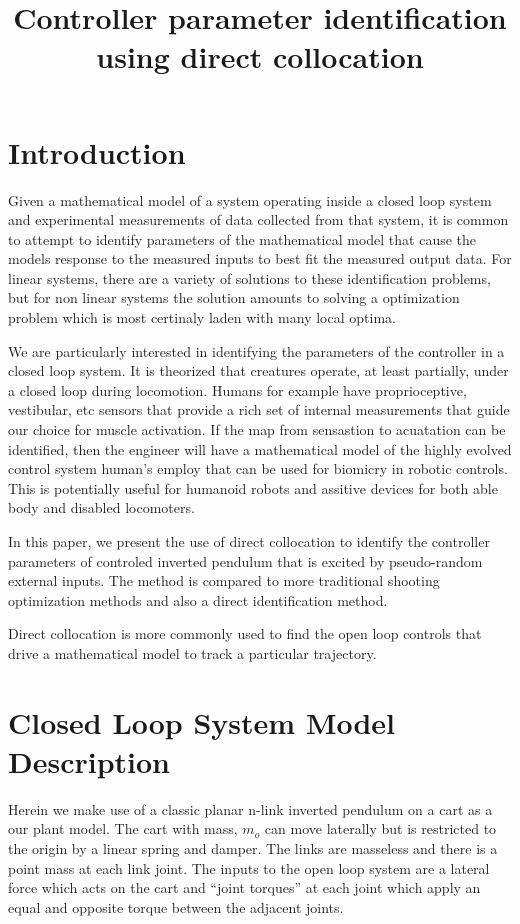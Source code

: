 \documentclass{article}
\title{Controller parameter identification using direct collocation}
\begin{document}
\maketitle

\section{Introduction}

Given a mathematical model of a system operating inside a closed loop system
and experimental measurements of data collected from that system, it is common
to attempt to identify parameters of the mathematical model that cause the
models response to the measured inputs to best fit the measured output data.
For linear systems, there are a variety of solutions to these identification
problems, but for non linear systems the solution amounts to solving a
optimization problem which is most certinaly laden with many local optima.

We are particularly interested in identifying the parameters of the controller
in a closed loop system. It is theorized that creatures operate, at least
partially, under a closed loop during locomotion. Humans for example have
proprioceptive, vestibular, etc sensors that provide a rich set of internal
measurements that guide our choice for muscle activation. If the map from
sensastion to acuatation can be identified, then the engineer will have a
mathematical model of the highly evolved control system human's employ that can
be used for biomicry in robotic controls. This is potentially useful for
humanoid robots and assitive devices for both able body and disabled
locomoters.

In this paper, we present the use of direct collocation to identify the
controller parameters of controled inverted pendulum that is excited by
pseudo-random external inputs. The method is compared to more traditional
shooting optimization methods and also a direct identification method.

Direct collocation is more commonly used to find the open loop controls that
drive a mathematical model to track a particular trajectory.

\section{Closed Loop System Model Description}

Herein we make use of a classic planar n-link inverted pendulum on a cart as a
our plant model. The cart with mass, $m_o$ can move laterally but is restricted
to the origin by a linear spring and damper. The links are masseless and there
is a point mass at each link joint. The inputs to the open loop system are a
lateral force which acts on the cart and ``joint torques'' at each joint which
apply an equal and opposite torque between the adjacent joints.
\end{document}
